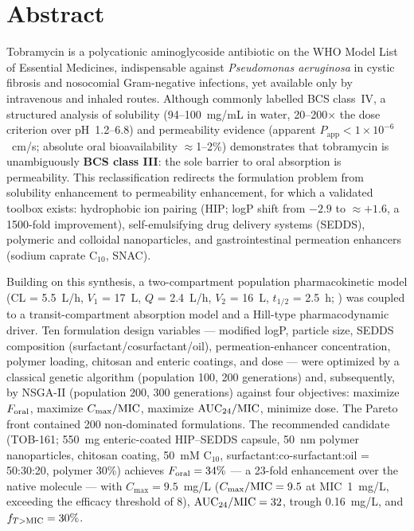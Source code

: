 \chapter*{Abstract}

Tobramycin is a polycationic aminoglycoside antibiotic on the WHO Model List of Essential Medicines, indispensable against \textit{Pseudomonas aeruginosa} in cystic fibrosis and nosocomial Gram-negative infections, yet available only by intravenous and inhaled routes. Although commonly labelled BCS class~IV, a structured analysis of solubility (94--100~mg/mL in water, 20--200$\times$ the dose criterion over pH~1.2--6.8) and permeability evidence (apparent $P_{\mathrm{app}}<1\times10^{-6}$~cm/s; absolute oral bioavailability $\approx$1--2\%) demonstrates that tobramycin is unambiguously \textbf{BCS class III}: the sole barrier to oral absorption is permeability. This reclassification redirects the formulation problem from solubility enhancement to permeability enhancement, for which a validated toolbox exists: hydrophobic ion pairing (HIP; logP shift from $-2.9$ to $\approx+1.6$, a 1500-fold improvement), self-emulsifying drug delivery systems (SEDDS), polymeric and colloidal nanoparticles, and gastrointestinal permeation enhancers (sodium caprate C$_{10}$, SNAC).

Building on this synthesis, a two-compartment population pharmacokinetic model (CL = 5.5~L/h, $V_1$ = 17~L, $Q$ = 2.4~L/h, $V_2$ = 16~L, $t_{1/2}$ = 2.5~h; \citet{Li2021}) was coupled to a transit-compartment absorption model and a Hill-type pharmacodynamic driver. Ten formulation design variables --- modified logP, particle size, SEDDS composition (surfactant/cosurfactant/oil), permeation-enhancer concentration, polymer loading, chitosan and enteric coatings, and dose --- were optimized by a classical genetic algorithm (population 100, 200 generations) and, subsequently, by NSGA-II (population 200, 300 generations) against four objectives: maximize $F_{\mathrm{oral}}$, maximize $C_{\max}/\mathrm{MIC}$, maximize $\mathrm{AUC}_{24}/\mathrm{MIC}$, minimize dose. The Pareto front contained 200 non-dominated formulations. The recommended candidate (TOB-161; 550~mg enteric-coated HIP--SEDDS capsule, 50~nm polymer nanoparticles, chitosan coating, 50~mM C$_{10}$, surfactant:co-surfactant:oil = 50:30:20, polymer 30\%) achieves $F_{\mathrm{oral}} = 34\%$ --- a 23-fold enhancement over the native molecule --- with $C_{\max} = 9.5$~mg/L ($C_{\max}/\mathrm{MIC} = 9.5$ at MIC~1~mg/L, exceeding the efficacy threshold of 8), $\mathrm{AUC}_{24}/\mathrm{MIC} = 32$, trough 0.16~mg/L, and $f_{T>\mathrm{MIC}} = 30\%$.

